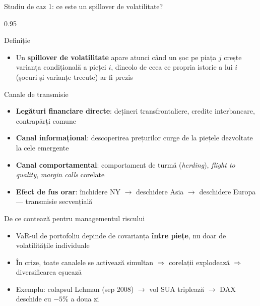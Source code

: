 \documentclass[9pt, aspectratio=169, t]{beamer}
\begin{document}
\begin{frame}{Studiu de caz 1: ce este un spillover de volatilitate?}
    \begin{cminipage}{0.95\textwidth}
    {\footnotesize
    \begin{block}{Definiție}
        \begin{itemize}\setlength{\itemsep}{0pt}
            \item Un \textbf{spillover de volatilitate} apare atunci când un șoc pe piața $j$ crește varianța condițională a pieței $i$, dincolo de ceea ce propria istorie a lui $i$ (șocuri și varianțe trecute) ar fi prezis
        \end{itemize}
    \end{block}
    \vspace{-2mm}
    \begin{block}{Canale de transmisie}
        \begin{itemize}\setlength{\itemsep}{0pt}
            \item \textbf{Legături financiare directe}: dețineri transfrontaliere, credite interbancare, contrapărți comune
            \item \textbf{Canal informațional}: descoperirea prețurilor curge de la piețele dezvoltate la cele emergente
            \item \textbf{Canal comportamental}: comportament de turmă (\textit{herding}), \textit{flight to quality}, \textit{margin calls} corelate
            \item \textbf{Efect de fus orar}: închidere NY $\rightarrow$ deschidere Asia $\rightarrow$ deschidere Europa --- transmisie secvențială
        \end{itemize}
    \end{block}
    \vspace{-2mm}
    \begin{alertblock}{De ce contează pentru managementul riscului}
        \begin{itemize}\setlength{\itemsep}{0pt}
            \item VaR-ul de portofoliu depinde de covarianța \textbf{între piețe}, nu doar de volatilitățile individuale
            \item În crize, toate canalele se activează simultan $\Rightarrow$ corelații explodează $\Rightarrow$ diversificarea eșuează
            \item Exemplu: colapsul Lehman (sep 2008) $\rightarrow$ vol SUA triplează $\rightarrow$ DAX deschide cu $-5\%$ a doua zi
        \end{itemize}
    \end{alertblock}
    }
    \end{cminipage}
\end{frame}
\end{document}
